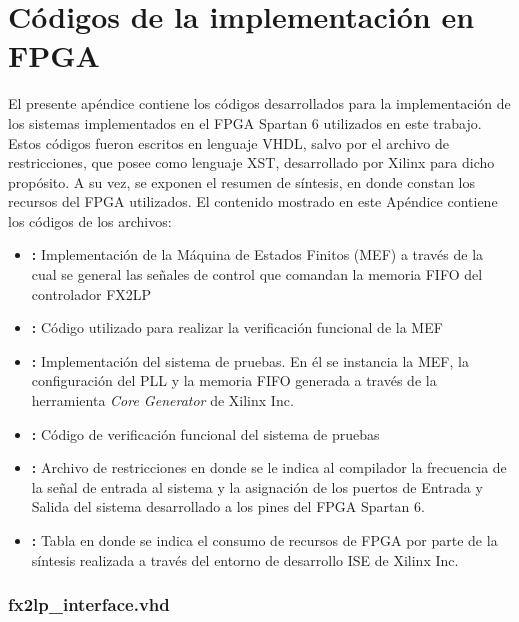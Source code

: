 \chapter{Códigos de la implementación en FPGA}
\label{ap:vhdl}

	El presente apéndice contiene los códigos desarrollados para la implementación de los sistemas implementados en el FPGA Spartan 6 utilizados en este trabajo. Estos códigos fueron escritos en lenguaje VHDL, salvo por el archivo de restricciones, que posee como lenguaje XST, desarrollado por Xilinx para dicho propósito. A su vez, se exponen el resumen de síntesis, en donde constan los recursos del FPGA utilizados.
 	El contenido mostrado en este Apéndice contiene los códigos de los archivos:
 	\begin{itemize}
		\item \textbf{:} Implementación de la Máquina de Estados Finitos (MEF) a través de la cual se general las señales de control que comandan la memoria FIFO del controlador FX2LP 
		
		\item \textbf{:} Código utilizado para realizar la verificación funcional de la MEF
		
		\item \textbf{:} Implementación del sistema de pruebas. En él se instancia la MEF, la configuración del PLL y la memoria FIFO generada a través de la herramienta \textit{Core Generator} de Xilinx Inc. 
		
		\item \textbf{:} Código de verificación funcional del sistema de pruebas 

		\item \textbf{:} Archivo de restricciones en donde se le indica al compilador la frecuencia de la señal de entrada al sistema y la asignación de los puertos de Entrada y Salida del sistema desarrollado a los pines del FPGA Spartan 6.

		\item \textbf{:} Tabla en donde se indica el consumo de recursos de FPGA por parte de la síntesis realizada a través del entorno de desarrollo ISE de Xilinx Inc.
	\end{itemize}


	\subsection*{fx2lp\_interface.vhd}
		\label{ap:vhdl:iffx2}
		
	
